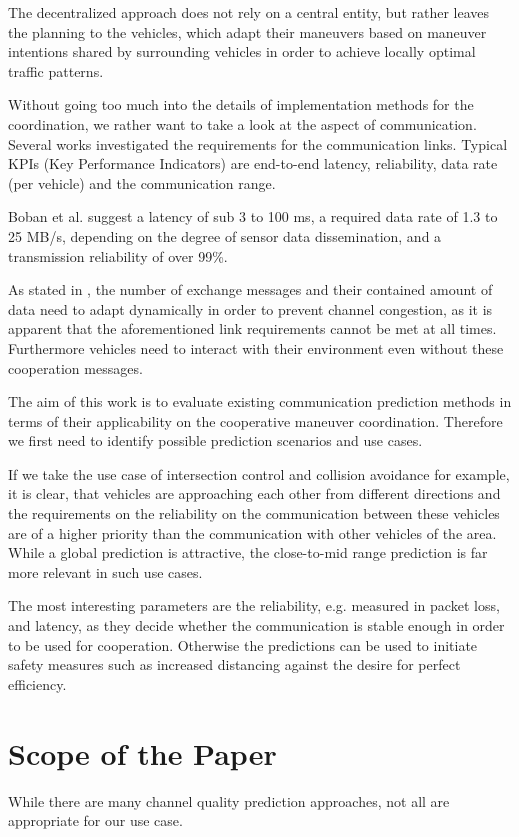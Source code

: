 \documentclass[conference]{IEEEtran}
\begin{document}
The decentralized approach does not rely on a central entity, but rather leaves the planning to the vehicles, which adapt their maneuvers based on maneuver intentions shared by surrounding vehicles in order to achieve locally optimal traffic patterns.

Without going too much into the details of implementation methods for the coordination, we rather want to take a look at the aspect of communication. Several works investigated the requirements for the communication links. Typical KPIs (Key Performance Indicators) are end-to-end latency, reliability, data rate (per vehicle) and the communication range.

Boban et al. \cite{bobanConnectedRoadsFuture2018} suggest a latency of sub 3 to 100 ms, a required data rate of 1.3 to 25 MB/s, depending on the degree of sensor data dissemination, and a transmission reliability of over 99\%.

As stated in \cite{llatserCooperativeAutomatedDriving2019}, the number of exchange messages and their contained amount of data need to adapt dynamically in order to prevent channel congestion, as it is apparent that the aforementioned link requirements cannot be met at all times. Furthermore vehicles need to interact with their environment even without these cooperation messages.

The aim of this work is to evaluate existing communication prediction methods in terms of their applicability on the cooperative maneuver coordination. Therefore we first need to identify possible prediction scenarios and use cases.

If we take the use case of intersection control and collision avoidance for example, it is clear, that vehicles are approaching each other from different directions and the requirements on the reliability on the communication between these vehicles are of a higher priority than the communication with other vehicles of the area. While a global prediction is attractive, the close-to-mid range prediction is far more relevant in such use cases. 

The most interesting parameters are the reliability, e.g. measured in packet loss, and latency, as they decide whether the communication is stable enough in order to be used for cooperation. Otherwise the predictions can be used to initiate safety measures such as increased distancing against the desire for perfect efficiency.

\section{Scope of the Paper}
While there are many channel quality prediction approaches, not all are appropriate for our use case.
\end{document}
